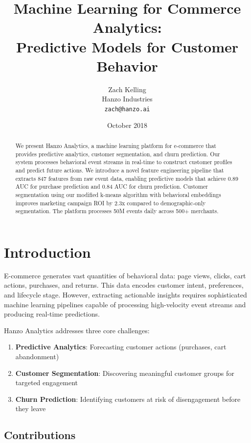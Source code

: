 \documentclass[11pt,a4paper]{article}
\title{\textbf{Machine Learning for Commerce Analytics:\\Predictive Models for Customer Behavior}}
\author{
    Zach Kelling\\
    Hanzo Industries\\
    \texttt{zach@hanzo.ai}
}
\date{October 2018}
\begin{document}
\luxcoverpage
\maketitle

\begin{abstract}
We present Hanzo Analytics, a machine learning platform for e-commerce that provides predictive analytics, customer segmentation, and churn prediction. Our system processes behavioral event streams in real-time to construct customer profiles and predict future actions. We introduce a novel feature engineering pipeline that extracts 847 features from raw event data, enabling predictive models that achieve 0.89 AUC for purchase prediction and 0.84 AUC for churn prediction. Customer segmentation using our modified k-means algorithm with behavioral embeddings improves marketing campaign ROI by 2.3x compared to demographic-only segmentation. The platform processes 50M events daily across 500+ merchants.
\end{abstract}

\section{Introduction}

E-commerce generates vast quantities of behavioral data: page views, clicks, cart actions, purchases, and returns. This data encodes customer intent, preferences, and lifecycle stage. However, extracting actionable insights requires sophisticated machine learning pipelines capable of processing high-velocity event streams and producing real-time predictions.

Hanzo Analytics addresses three core challenges:

\begin{enumerate}
    \item \textbf{Predictive Analytics}: Forecasting customer actions (purchases, cart abandonment)
    \item \textbf{Customer Segmentation}: Discovering meaningful customer groups for targeted engagement
    \item \textbf{Churn Prediction}: Identifying customers at risk of disengagement before they leave
\end{enumerate}

\subsection{Contributions}
\end{document}
